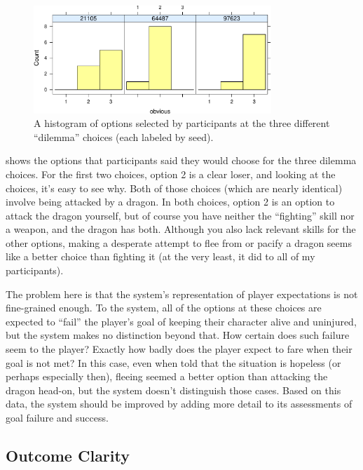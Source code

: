 \begin{figure}[!h]
  \centering
  \includegraphics[width=0.8\textwidth,page=3]{fig/choices-cropped.pdf}
  \caption{A histogram of options selected by participants at the three different ``dilemma'' choices (each labeled by seed).}
  \label{fig:dilchoices}
\end{figure}


 shows the options that participants said they would choose for the three dilemma choices.
%
For the first two choices, option 2 is a clear loser, and looking at the choices, it's easy to see why.
%
Both of those choices (which are nearly identical) involve being attacked by a dragon.
%
In both choices, option 2 is an option to attack the dragon yourself, but of course you have neither the ``fighting'' skill nor a weapon, and the dragon has both.
%
Although you also lack relevant skills for the other options, making a desperate attempt to flee from or pacify a dragon seems like a better choice than fighting it (at the very least, it did to all of my participants).


The problem here is that the system's representation of player expectations is not fine-grained enough.
%
To the system, all of the options at these choices are expected to ``fail'' the player's goal of keeping their character alive and uninjured, but the system makes no distinction beyond that.
%
How certain does such failure seem to the player?
%
Exactly how badly does the player expect to fare when their goal is not met?
%
In this case, even when told that the situation is hopeless (or perhaps especially then), fleeing seemed a better option than attacking the dragon head-on, but the system doesn't distinguish those cases.
%
Based on this data, the system should be improved by adding more detail to its assessments of goal failure and success.


\subsection{Outcome Clarity}


